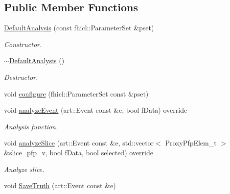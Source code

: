 \subsection*{Public Member Functions}
\begin{DoxyCompactItemize}
\item 
\hyperlink{classanalysis_1_1DefaultAnalysis_a857349701c91ee06075ea01c5edc15b6}{Default\-Analysis} (const fhicl\-::\-Parameter\-Set \&pset)
\begin{DoxyCompactList}\small\item\em Constructor. \end{DoxyCompactList}\item 
\hypertarget{classanalysis_1_1DefaultAnalysis_ad4be6c0a18f97e1d02a5c1e905ac5786}{\hyperlink{classanalysis_1_1DefaultAnalysis_ad4be6c0a18f97e1d02a5c1e905ac5786}{$\sim$\-Default\-Analysis} ()}\label{classanalysis_1_1DefaultAnalysis_ad4be6c0a18f97e1d02a5c1e905ac5786}

\begin{DoxyCompactList}\small\item\em Destructor. \end{DoxyCompactList}\item 
void \hyperlink{classanalysis_1_1DefaultAnalysis_a475f62ff6b6dae44bb4f3c917f0970de}{configure} (fhicl\-::\-Parameter\-Set const \&pset)
\item 
void \hyperlink{classanalysis_1_1DefaultAnalysis_a0cf6d593602ba67c23fae67ca7989c10}{analyze\-Event} (art\-::\-Event const \&e, bool f\-Data) override
\begin{DoxyCompactList}\small\item\em Analysis function. \end{DoxyCompactList}\item 
\hypertarget{classanalysis_1_1DefaultAnalysis_ad676faeeb49900efb0c9a615a60d179c}{void \hyperlink{classanalysis_1_1DefaultAnalysis_ad676faeeb49900efb0c9a615a60d179c}{analyze\-Slice} (art\-::\-Event const \&e, std\-::vector$<$ Proxy\-Pfp\-Elem\-\_\-t $>$ \&slice\-\_\-pfp\-\_\-v, bool f\-Data, bool selected) override}\label{classanalysis_1_1DefaultAnalysis_ad676faeeb49900efb0c9a615a60d179c}

\begin{DoxyCompactList}\small\item\em Analyze slice. \end{DoxyCompactList}\item 
\hypertarget{classanalysis_1_1DefaultAnalysis_a5d973c6b88477330f6b744f3c9c60dd6}{void \hyperlink{classanalysis_1_1DefaultAnalysis_a5d973c6b88477330f6b744f3c9c60dd6}{Save\-Truth} (art\-::\-Event const \&e)}\label{classanalysis_1_1DefaultAnalysis_a5d973c6b88477330f6b744f3c9c60dd6}


\end{DoxyCompactItemize}

